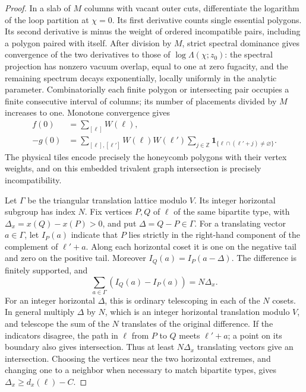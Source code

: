 \begin{proof}
In a slab of \(M\) columns with vacant outer cuts, differentiate the logarithm of the loop partition at \(\chi=0\). Its first derivative counts single essential polygons. Its second derivative is minus the weight of ordered incompatible pairs, including a polygon paired with itself. After division by \(M\), strict spectral dominance gives convergence of the two derivatives to those of \(\log\Lambda(\chi;z_0)\): the spectral projection has nonzero vacuum overlap, equal to one at zero fugacity, and the remaining spectrum decays exponentially, locally uniformly in the analytic parameter. Combinatorially each finite polygon or intersecting pair occupies a finite consecutive interval of columns; its number of placements divided by \(M\) increases to one. Monotone convergence gives
\begin{equation}
 \begin{split}
 f(0)&=\sum_{[\ell]}W(\ell),\\
 -g(0)&=\sum_{[\ell],[\ell']}W(\ell)W(\ell')
        \sum_{j\in\mathbb Z}
          \mathbf1_{\{\ell\cap(\ell'+j)\ne\varnothing\}}.
 \end{split}
 \label{eq:05-cluster-derivatives}
\end{equation}
The physical tiles encode precisely the honeycomb polygons with their vertex weights, and on this embedded trivalent graph intersection is precisely incompatibility.

Let \(\Gamma\) be the triangular translation lattice modulo \(V\). Its integer horizontal subgroup has index \(N\). Fix vertices \(P,Q\) of \(\ell\) of the same bipartite type, with \(\Delta_x=x(Q)-x(P)>0\), and put \(\Delta=Q-P\in\Gamma\). For a translating vector \(a\in\Gamma\), let \(I_P(a)\) indicate that \(P\) lies strictly in the right-hand component of the complement of \(\ell'+a\). Along each horizontal coset it is one on the negative tail and zero on the positive tail. Moreover \(I_Q(a)=I_P(a-\Delta)\). The difference is finitely supported, and
\[
 \sum_{a\in\Gamma}(I_Q(a)-I_P(a))=N\Delta_x.
\]
For an integer horizontal \(\Delta\), this is ordinary telescoping in each of the \(N\) cosets. In general multiply \(\Delta\) by \(N\), which is an integer horizontal translation modulo \(V\), and telescope the sum of the \(N\) translates of the original difference. If the indicators disagree, the path in \(\ell\) from \(P\) to \(Q\) meets \(\ell'+a\); a point on its boundary also gives intersection. Thus at least \(N\Delta_x\) translating vectors give an intersection. Choosing the vertices near the two horizontal extremes, and changing one to a neighbor when necessary to match bipartite types, gives \(\Delta_x\ge d_x(\ell)-C\).


\end{proof}
